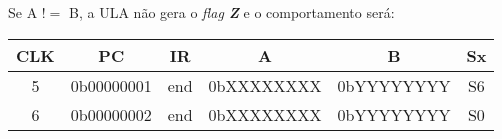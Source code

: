 \documentclass[../main.tex]{subfiles}
\begin{document}
Se A $!=$ B, a ULA não gera o \textit{flag \textbf{Z}} e o comportamento será:

\begin{table}[H]
	\centering
	\begin{tabular}{|c|c|c|c|c|c|} %
	\hline
	CLK & PC & IR & A& B & Sx \\\hline
	5 & 0b00000001 & end & 0bXXXXXXXX & 0bYYYYYYYY & S6 \\\hline 
	6 & 0b00000002 & end & 0bXXXXXXXX & 0bYYYYYYYY & S0 \\\hline 	
	\end{tabular}	
\end{table}
\end{document}

